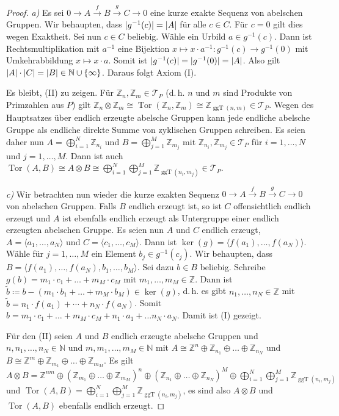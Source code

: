 \documentclass[11pt, a4paper, german]{article}
\theoremstyle{definition}
\theoremstyle{remark}
\newcommand{\N}{\mathbb{N}} %
\newcommand{\Z}{\mathbb{Z}} %
\newcommand{\angles}[1]{{\langle #1 \rangle}}
\DeclareMathOperator{\Tor}{Tor} %
\newcommand{\T}{\mathcal{T}} %
\DeclarePairedDelimiter\abs{\lvert}{\rvert} %
\DeclarePairedDelimiter\ord{\lvert}{\rvert} %
\DeclareMathOperator{\ggT}{ggT} %
\renewcommand{\dh}{d.\,h.} %
\begin{document}
\begin{proof}
  \emph{a)} \enspace Es sei $0 \to A \xrightarrow{f} B \xrightarrow{g} C \to 0$ eine kurze exakte Sequenz von abelschen Gruppen.
  Wir behaupten, dass $\abs{g^{-1}(c)} = \abs{A}$ für alle $c \in C$.
  Für $c = 0$ gilt dies wegen Exaktheit.
  Sei nun $c \in C$ beliebig.
  Wähle ein Urbild $a \in g^{-1}(c)$.
  Dann ist Rechtsmultiplikation mit $a^{-1}$ eine Bijektion $x \mapsto x \cdot a^{-1} : g^{-1}(c) \to g^{-1}(0)$ mit Umkehrabbildung $x \mapsto x \cdot a$.
  Somit ist $\abs{g^{-1}(c)} = \abs{g^{-1}(0)} = \abs{A}$.
  Also gilt $\ord{A} \cdot \ord{C} = \ord{B} \in \N \cup \{ \infty \}$.
  Daraus folgt Axiom (I).
  
  Es bleibt, (II) zu zeigen.
  Für $\Z_n, \Z_m \in \T_P$ (\dh{} $n$ und $m$ sind Produkte von Primzahlen aus $P$) gilt $\Z_n \otimes \Z_m \cong \Tor(\Z_n, \Z_m) \cong \Z_{\ggT(n, m)} \in \T_P$.
  Wegen des Hauptsatzes über endlich erzeugte abelsche Gruppen kann jede endliche abelsche Gruppe als endliche direkte Summe von zyklischen Gruppen schreiben.
  Es seien daher nun $A = \bigoplus_{i=1}^N \Z_{n_i}$ und $B = \bigoplus_{j=1}^M \Z_{m_j}$ mit $\Z_{n_i}, \Z_{m_j} \in \T_P$ für $i = 1, \ldots, N$ und $j = 1, \ldots, M$.
  Dann ist auch $\Tor(A, B) \cong A \otimes B \cong \bigoplus_{i=1}^N \bigoplus_{j=1}^M \Z_{\ggT(n_i, m_j)} \in \T_P$.

  \emph{c)} \enspace Wir betrachten nun wieder die kurze exakten Sequenz $0 \to A \xrightarrow{f} B \xrightarrow{g} C \to 0$ von abelschen Gruppen.
  Falls $B$ endlich erzeugt ist, so ist $C$ offensichtlich endlich erzeugt und $A$ ist ebenfalls endlich erzeugt als Untergruppe einer endlich erzeugten abelschen Gruppe.
  Es seien nun $A$ und $C$ endlich erzeugt, $A = \angles{a_1, \ldots, a_N}$ und $C = \angles{c_1, \ldots, c_M}$.
  Dann ist $\ker(g) = \angles{f(a_1), \ldots, f(a_N)}$.
  Wähle für $j = 1, \ldots, M$ ein Element $b_j \in g^{-1}(c_j)$.
  Wir behaupten, dass $B = \angles{f(a_1), \ldots, f(a_N), b_1, \ldots, b_M}$.
  Sei dazu $b \in B$ beliebig.
  Schreibe $g(b) = m_1 \cdot c_1 + \ldots + m_M \cdot c_M$ mit $m_1, \ldots, m_M \in \Z$.
  Dann ist $\tilde{b} \coloneqq b - (m_1 \cdot b_1 + \ldots + m_M \cdot b_M) \in \ker(g)$, \dh{} es gibt $n_1, \ldots, n_N \in \Z$ mit $\tilde{b} = n_1 \cdot f(a_1) + \cdots + n_N \cdot f(a_N)$.
  Somit $b = m_1 \cdot c_1 + \ldots + m_M \cdot c_M + n_1 \cdot a_1 + \ldots n_N \cdot a_N$.
  Damit ist (I) gezeigt.

  Für den (II) seien $A$ und $B$ endlich erzeugte abelsche Gruppen und $n, n_1, \ldots, n_N \in \N$ und $m, m_1, \ldots, m_M \in \N$ mit $A \cong \Z^n \oplus \Z_{n_1} \oplus \ldots \oplus \Z_{n_N}$ und $B \cong \Z^m \oplus \Z_{m_1} \oplus \ldots \oplus \Z_{m_M}$.
  Es gilt $A \otimes B = \Z^{nm} \oplus \left( \Z_{m_1} \oplus \ldots \oplus \Z_{m_M} \right)^n \oplus \left( \Z_{n_1} \oplus \ldots \oplus \Z_{n_N} \right)^M \oplus \bigoplus_{i=1}^N \bigoplus_{j=1}^M \Z_{\ggT(n_i, m_j)}$
  und $\Tor(A, B) = \bigoplus_{i=1}^N \bigoplus_{j=1}^M \Z_{\ggT(n_i, m_j)}$, es sind also $A \otimes B$ und $\Tor(A, B)$ ebenfalls endlich erzeugt.
\end{proof}
\end{document}
